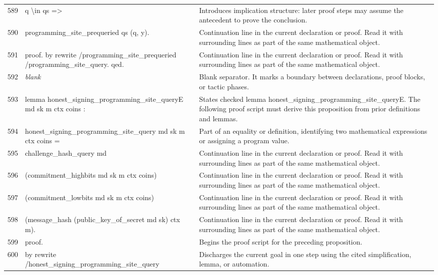 \documentclass[10pt]{article}
\begin{document}
\begin{longtable}{r L{0.53\textwidth} L{0.37\textwidth}}
589 & {\ttfamily\scriptsize   q \textbackslash{}in qs =>} & Introduces implication structure: later proof steps may assume the antecedent to prove the conclusion. \\
590 & {\ttfamily\scriptsize   programming\_site\_prequeried qs (q, y).} & Continuation line in the current declaration or proof.  Read it with surrounding lines as part of the same mathematical object. \\
591 & {\ttfamily\scriptsize proof. by rewrite /programming\_site\_prequeried /programming\_site\_query. qed.} & Continuation line in the current declaration or proof.  Read it with surrounding lines as part of the same mathematical object. \\
592 & {\ttfamily\scriptsize \emph{blank}} & Blank separator.  It marks a boundary between declarations, proof blocks, or tactic phases. \\
593 & {\ttfamily\scriptsize lemma honest\_signing\_programming\_site\_queryE md sk m ctx coins :} & States checked lemma honest\_signing\_programming\_site\_queryE.  The following proof script must derive this proposition from prior definitions and lemmas. \\
594 & {\ttfamily\scriptsize   honest\_signing\_programming\_site\_query md sk m ctx coins =} & Part of an equality or definition, identifying two mathematical expressions or assigning a program value. \\
595 & {\ttfamily\scriptsize   challenge\_hash\_query md} & Continuation line in the current declaration or proof.  Read it with surrounding lines as part of the same mathematical object. \\
596 & {\ttfamily\scriptsize     (commitment\_highbits md sk m ctx coins)} & Continuation line in the current declaration or proof.  Read it with surrounding lines as part of the same mathematical object. \\
597 & {\ttfamily\scriptsize     (commitment\_lowbits md sk m ctx coins)} & Continuation line in the current declaration or proof.  Read it with surrounding lines as part of the same mathematical object. \\
598 & {\ttfamily\scriptsize     (message\_hash (public\_key\_of\_secret md sk) ctx m).} & Continuation line in the current declaration or proof.  Read it with surrounding lines as part of the same mathematical object. \\
599 & {\ttfamily\scriptsize proof.} & Begins the proof script for the preceding proposition. \\
600 & {\ttfamily\scriptsize by rewrite /honest\_signing\_programming\_site\_query} & Discharges the current goal in one step using the cited simplification, lemma, or automation. \\

\end{longtable}
\end{document}
